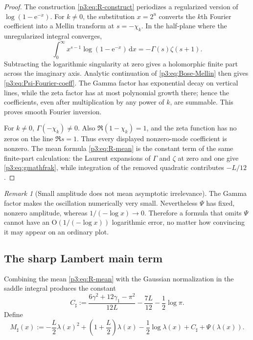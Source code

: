 \documentclass[11pt]{article}
\numberwithin{equation}{section}
\theoremstyle{definition}
\theoremstyle{remark}
\newtheorem{remark}[theorem]{Remark}
\newcommand{\dd}{\,\mathrm d}
\newcommand{\e}{\mathrm e}
\newcommand{\Oh}{\mathrm O}
\begin{document}
\begin{proof}
The construction \eqref{p3:eq:R-construct} periodizes a regularized version of
$\log(1-\e^{-x})$.  For $k\ne0$, the substitution $x=2^u$ converts the $k$th
Fourier coefficient into a Mellin transform at
$s=-\chi_k$.  In the half-plane where the unregularized integral converges,
\begin{equation}\label{p3:eq:Bose-Mellin}
 \int_0^\infty x^{s-1}\log(1-\e^{-x})\dd x
 =-\Gamma(s)\zeta(s+1).
\end{equation}
Subtracting the logarithmic singularity at zero gives a holomorphic finite
part across the imaginary axis.  Analytic continuation of
\eqref{p3:eq:Bose-Mellin} then gives \eqref{p3:eq:Psi-Fourier-coeff}.  The Gamma
factor has exponential decay on vertical lines, while the zeta factor has at
most polynomial growth there; hence the coefficients, even after
multiplication by any power of $k$, are summable.  This proves smooth Fourier
inversion.

For $k\ne0$, $\Gamma(-\chi_k)\ne0$.  Also
$\Re(1-\chi_k)=1$, and the zeta function has no zeros on the line
$\Re s=1$.  Thus every displayed nonzero-mode coefficient is nonzero.
The mean formula \eqref{p3:eq:R-mean} is the constant term of the same
finite-part calculation: the Laurent expansions of $\Gamma$ and $\zeta$ at
zero and one give \eqref{p3:eq:gmathfrak}, while integration of the removed
quadratic contributes $-L/12$.
\end{proof}

\begin{remark}[Small amplitude does not mean asymptotic irrelevance]
The Gamma factor makes the oscillation numerically very small.  Nevertheless
$\Psi$ has fixed, nonzero amplitude, whereas $1/(-\log x)\to0$.  Therefore a
formula that omits $\Psi$ cannot have an $\Oh(1/(-\log x))$ logarithmic error,
no matter how convincing it may appear on an ordinary plot.
\end{remark}

\subsection{The sharp Lambert main term}

Combining the mean \eqref{p3:eq:R-mean} with the Gaussian normalization in the
saddle integral produces the constant
\begin{equation}\label{p3:eq:Csharp}
 C_\sharp:=
 \frac{6\gamma^2+12\gamma_1-\pi^2}{12L}
 -\frac{7L}{12}-\frac12\log\pi.
\end{equation}
Define
\begin{equation}\label{p3:eq:Msharp}
\boxed{
 M_\sharp(x):=-\frac L2\lambda(x)^2
 +\left(1+\frac L2\right)\lambda(x)
 -\frac12\log\lambda(x)+C_\sharp+\Psi(\lambda(x)).}
\end{equation}
\end{document}
